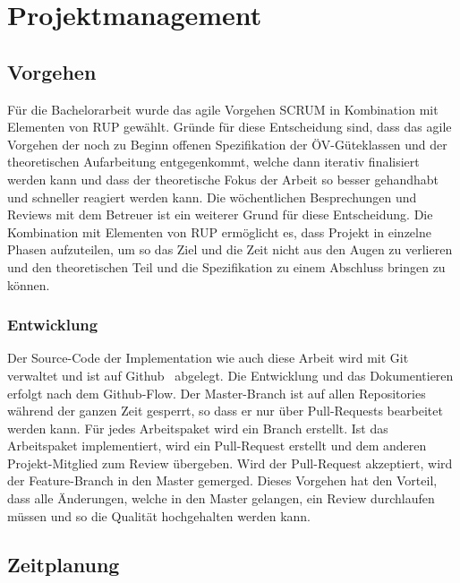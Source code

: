 
\section{Projektmanagement}
\label{Projektmanagement}

\subsection{Vorgehen}
\label{Projektmanagement:Vorgehen}

Für die Bachelorarbeit wurde das agile Vorgehen SCRUM in Kombination mit Elementen von \ac{RUP} gewählt.
Gründe für diese Entscheidung sind, dass das agile Vorgehen der noch zu Beginn offenen Spezifikation der \acs{ÖV}-Güteklassen und der theoretischen Aufarbeitung entgegenkommt, welche dann iterativ finalisiert werden kann und dass der theoretische Fokus der Arbeit so besser gehandhabt und schneller reagiert werden kann.
Die wöchentlichen Besprechungen und Reviews mit dem Betreuer ist ein weiterer Grund für diese Entscheidung.
Die Kombination mit Elementen von \ac{RUP} ermöglicht es, dass Projekt in einzelne Phasen aufzuteilen, um so das Ziel und die Zeit nicht aus den Augen zu verlieren und den theoretischen Teil und die Spezifikation zu einem Abschluss bringen zu können.

\subsubsection{Entwicklung}
\label{Vorgehen:Entwicklung}

Der Source-Code der Implementation wie auch diese Arbeit wird mit Git verwaltet und ist auf Github~\cite{github} abgelegt.
Die Entwicklung und das Dokumentieren erfolgt nach dem Github-Flow.
Der Master-Branch ist auf allen Repositories während der ganzen Zeit gesperrt, so dass er nur über Pull-Requests bearbeitet werden kann.
Für jedes Arbeitspaket wird ein Branch erstellt.
Ist das Arbeitspaket implementiert, wird ein Pull-Request erstellt und dem anderen Projekt-Mitglied zum Review übergeben.
Wird der Pull-Request akzeptiert, wird der Feature-Branch in den Master gemerged.
Dieses Vorgehen hat den Vorteil, dass alle Änderungen, welche in den Master gelangen, ein Review durchlaufen müssen und so die Qualität hochgehalten werden kann.


\subsection{Zeitplanung}
\label{Projektmanagement:Zeitplanung}

